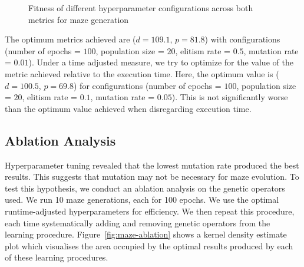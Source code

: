 \begin{figure}[!h]
\centering
            \hfill
            \hfill
            \caption{Fitness of different hyperparameter configurations across both metrics for maze generation}
\label{fig:maze-hyperparam}
\end{figure}

The optimum metrics achieved are ($d=109.1$, $p=81.8$) with configurations (number of epochs = $100$, population size = $20$, elitism rate = $0.5$, mutation rate = $0.01$). Under a time adjusted measure, we try to optimize for the value of the metric achieved relative to the execution time. Here, the optimum value is ($d=100.5$, $p=69.8$) for configurations (number of epochs = $100$, population size = $20$, elitism rate = $0.1$, mutation rate = $0.05$). This is not significantly worse than the optimum value achieved when disregarding execution time.

\subsection{Ablation Analysis}
Hyperparameter tuning revealed that the lowest mutation rate produced the best results. This suggests that mutation may not be necessary for maze evolution. To test this hypothesis, we conduct an ablation analysis on the genetic operators used. We run 10 maze generations, each for 100 epochs. We use the optimal runtime-adjusted hyperparameters for efficiency. We then repeat this procedure, each time systematically adding and removing genetic operators from the learning procedure. Figure~\ref{fig:maze-ablation} shows a kernel density estimate plot which visualises the area occupied by the optimal results produced by each of these learning procedures.\\

